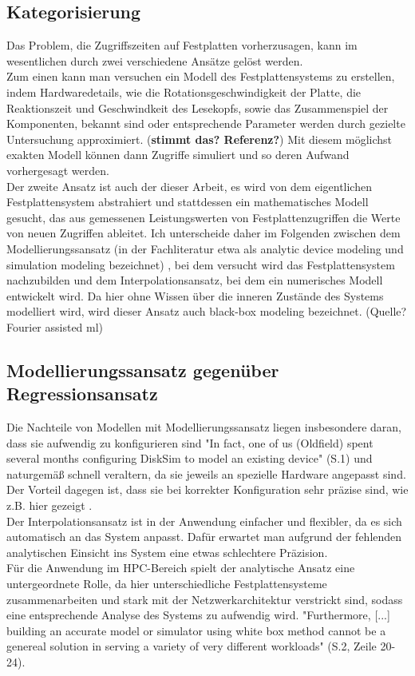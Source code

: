 \documentclass[
	12pt,
	a4paper,
	BCOR10mm,
	DIV14,
	listof=totoc,
	bibliography=totoc,
	headsepline
]{scrreprt}
\begin{document}
\subsection{Kategorisierung}
	Das Problem, die Zugriffszeiten auf Festplatten vorherzusagen, kann im wesentlichen durch zwei verschiedene Ansätze gelöst werden.\\ Zum einen kann man versuchen ein Modell des Festplattensystems zu erstellen, indem Hardwaredetails, wie die Rotationsgeschwindigkeit der Platte, die Reaktionszeit und Geschwindkeit des Lesekopfs, sowie das Zusammenspiel der Komponenten, bekannt sind oder entsprechende Parameter werden durch gezielte Untersuchung approximiert. (\textbf{stimmt das? Referenz?}) Mit diesem möglichst exakten Modell können dann Zugriffe simuliert und so deren Aufwand vorhergesagt werden. \\ Der zweite Ansatz ist auch der dieser Arbeit, es wird von dem eigentlichen Festplattensystem abstrahiert und stattdessen ein mathematisches Modell gesucht, das aus gemessenen Leistungswerten von Festplattenzugriffen die Werte von neuen Zugriffen ableitet. Ich unterscheide daher im Folgenden zwischen dem Modellierungssansatz (in der Fachliteratur etwa als analytic device modeling und simulation modeling bezeichnet)
, bei dem versucht wird das Festplattensystem nachzubilden und dem Interpolationsansatz, bei dem ein numerisches Modell entwickelt wird. Da hier ohne Wissen über die inneren Zustände des Systems modelliert wird, wird dieser Ansatz auch black-box modeling bezeichnet. (Quelle? Fourier assisted ml)
	
\subsection{Modellierungssansatz gegenüber Regressionsansatz}
	Die Nachteile von Modellen mit Modellierungssansatz liegen insbesondere daran, dass sie aufwendig zu konfigurieren sind "In fact, one of us (Oldfield) spent several months configuring DiskSim to model an existing device" \cite{Crume:2013:FML:2538542.2538561} (S.1) und naturgemäß schnell veraltern, da sie jeweils an spezielle Hardware angepasst sind. Der Vorteil dagegen ist, dass sie bei korrekter Konfiguration sehr präzise sind, wie z.B. hier gezeigt \cite{Ruemmler94anintroduction}. \\
	Der Interpolationsansatz ist in der Anwendung einfacher und flexibler, da es sich automatisch an das System anpasst. Dafür erwartet man aufgrund der fehlenden analytischen Einsicht ins System eine etwas schlechtere Präzision. \\ Für die Anwendung im HPC-Bereich spielt der analytische Ansatz eine untergeordnete Rolle, da hier unterschiedliche Festplattensysteme zusammenarbeiten und stark mit der Netzwerkarchitektur verstrickt sind, sodass eine entsprechende Analyse des Systems zu aufwendig wird. "Furthermore, [...] building an accurate model or simulator using white box method cannot be a genereal solution in serving a variety of very different workloads" \cite{DBLP:conf/npc/ZhangLZJC10} (S.2, Zeile 20-24).\\
	
\end{document}
